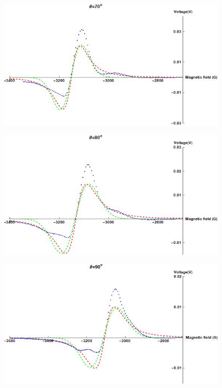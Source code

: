 \documentclass[openany,11pt,a4paper]{report}
\begin{document}
\begin{figure}[H]
\centering
\includegraphics[scale=0.6]{70.jpg}
\end{figure}





\begin{figure}[H]
\centering
\includegraphics[scale=0.6]{80.jpg}
\end{figure}





\begin{figure}[H]
\centering
\includegraphics[scale=0.6]{90.jpg}
\end{figure}
\end{document}
